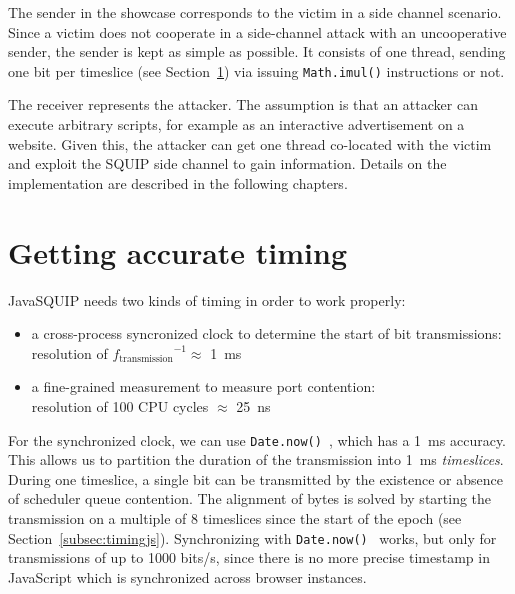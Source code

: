 \documentclass[11pt,
  titlepage=false,
  parskip=half,      %
]{scrreprt}
\begin{document}
The sender in the showcase corresponds to the victim in a side channel scenario.
Since a victim does not cooperate in a side-channel attack with an uncooperative sender, the sender is kept as simple as possible.
It consists of one thread, sending one bit per timeslice (see Section~\ref{sec:accurate-timing}) via issuing \texttt{Math.imul()} instructions or not.

\pagebreak
The receiver represents the attacker.
The assumption is that an attacker can execute arbitrary scripts, for example as an interactive advertisement on a website.
Given this, the attacker can get one thread co-located with the victim and exploit the SQUIP side channel to gain information.
Details on the implementation are described in the following chapters.

\section{Getting accurate timing}
\label{sec:accurate-timing}
JavaSQUIP needs two kinds of timing in order to work properly:
\begin{itemize}
    \item a cross-process syncronized clock to determine the start of bit transmissions:\\
    resolution of ${f_{\text{transmission}}}^{-1} \approx$ 1~ms
    \item a fine-grained measurement to measure port contention:\\
    resolution of 100 CPU cycles $\approx$ 25~ns
\end{itemize}

For the synchronized clock, we can use \texttt{Date.now()}~\cite{datenow}, which has a 1~ms accuracy.
This allows us to partition the duration of the transmission into 1~ms \textit{timeslices}.
During one timeslice, a single bit can be transmitted by the existence or absence of scheduler queue contention.
The alignment of bytes is solved by starting the transmission on a multiple of 8 timeslices since the start of the epoch (see Section~\ref{subsec:timingjs}).
Synchronizing with \texttt{Date.now()}~\cite{datenow} works, but only for transmissions of up to 1000 bits/s,
since there is no more precise timestamp in JavaScript which is synchronized across browser instances.

\end{document}

